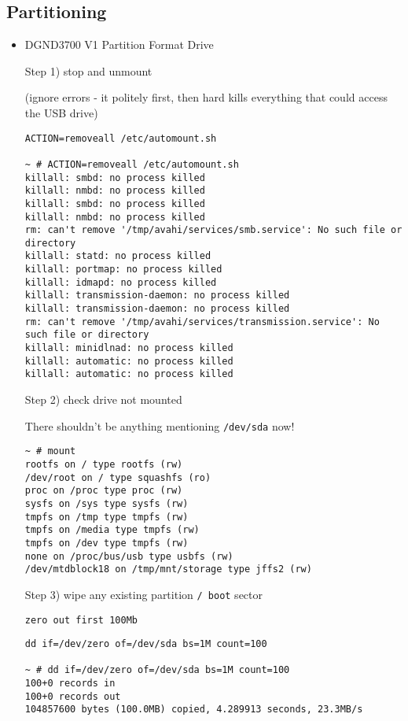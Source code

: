 \subsection{Partitioning}

\begin{itemize}

\item DGND3700 V1 Partition Format Drive

Step 1) stop and unmount

(ignore errors - it politely first, then hard kills everything that could access the USB drive)

\begin{verbatim}
ACTION=removeall /etc/automount.sh

~ # ACTION=removeall /etc/automount.sh
killall: smbd: no process killed
killall: nmbd: no process killed
killall: smbd: no process killed
killall: nmbd: no process killed
rm: can't remove '/tmp/avahi/services/smb.service': No such file or directory
killall: statd: no process killed
killall: portmap: no process killed
killall: idmapd: no process killed
killall: transmission-daemon: no process killed
killall: transmission-daemon: no process killed
rm: can't remove '/tmp/avahi/services/transmission.service': No such file or directory
killall: minidlnad: no process killed
killall: automatic: no process killed
killall: automatic: no process killed
\end{verbatim}

Step 2) check drive not mounted

There shouldn't be anything mentioning \verb=/dev/sda= now!

\begin{verbatim}
~ # mount 
rootfs on / type rootfs (rw)
/dev/root on / type squashfs (ro)
proc on /proc type proc (rw)
sysfs on /sys type sysfs (rw)
tmpfs on /tmp type tmpfs (rw)
tmpfs on /media type tmpfs (rw)
tmpfs on /dev type tmpfs (rw)
none on /proc/bus/usb type usbfs (rw)
/dev/mtdblock18 on /tmp/mnt/storage type jffs2 (rw)
\end{verbatim}

Step 3) wipe any existing partition \verb=/ boot= sector

\begin{verbatim}
zero out first 100Mb
\end{verbatim}

\begin{verbatim}
dd if=/dev/zero of=/dev/sda bs=1M count=100

~ # dd if=/dev/zero of=/dev/sda bs=1M count=100
100+0 records in
100+0 records out
104857600 bytes (100.0MB) copied, 4.289913 seconds, 23.3MB/s
\end{verbatim}


\end{itemize}
